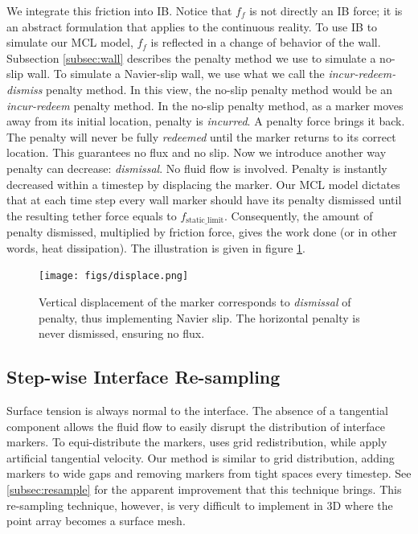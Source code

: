 \documentclass{jfm}
\begin{document}
We integrate this friction into IB. Notice that $f_f$ is not directly an IB force; it is an abstract formulation that applies to the continuous reality. To use IB to simulate our MCL model, $f_f$ is reflected in a change of behavior of the wall. Subsection \ref{subsec:wall} describes the penalty method we use to simulate a no-slip wall. To simulate a Navier-slip wall, we use what we call the \textit{incur-redeem-dismiss} penalty method. In this view, the no-slip penalty method would be an \textit{incur-redeem} penalty method. In the no-slip penalty method, as a marker moves away from its initial location, penalty is \textit{incurred}. A penalty force brings it back. The penalty will never be fully \textit{redeemed} until the marker returns to its correct location. This guarantees no flux and no slip. Now we introduce another way penalty can decrease: \textit{dismissal}. No fluid flow is involved. Penalty is instantly decreased within a timestep by displacing the marker. Our MCL model dictates that at each time step every wall marker should have its penalty dismissed until the resulting tether force equals to $f_\text{static\_limit}$. Consequently, the amount of penalty dismissed, multiplied by friction force, gives the work done (or in other words, heat dissipation). The illustration is given in figure \ref{fig:displace}. 
\begin{figure}
    \centering
    \texttt{[image: figs/displace.png]}
    \caption{
        Vertical displacement of the marker corresponds to \textit{dismissal} of penalty, thus implementing Navier slip. The horizontal penalty is never dismissed, ensuring no flux. 
    }
    \label{fig:displace}
\end{figure}

\subsection{Step-wise Interface Re-sampling}
Surface tension is always normal to the interface. The absence of a tangential component allows the fluid flow to easily disrupt the distribution of interface markers. To equi-distribute the markers, \cite{lai2008immersed} uses grid redistribution, while \cite{hou1994removing, MCL_IBM_surfactant} apply artificial tangential velocity. Our method is similar to grid distribution, adding markers to wide gaps and removing markers from tight spaces every timestep. See \ref{subsec:resample} for the apparent improvement that this technique brings. This re-sampling technique, however, is very difficult to implement in 3D where the point array becomes a surface mesh.  
\end{document}
